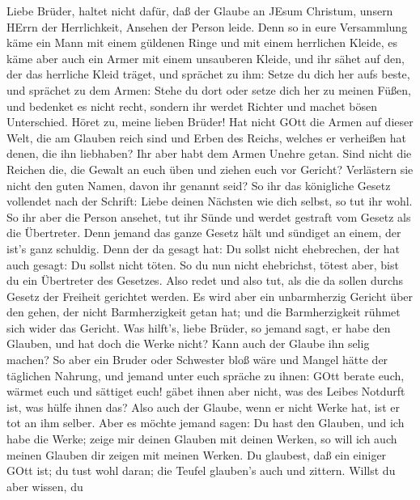  Liebe Brüder, haltet nicht dafür, daß der Glaube an JEsum
Christum, unsern HErrn der Herrlichkeit, Ansehen der Person leide.
 Denn so in eure Versammlung käme ein Mann mit einem
güldenen Ringe und mit einem herrlichen Kleide, es käme aber auch ein
Armer mit einem unsauberen Kleide,  und ihr sähet auf den,
der das herrliche Kleid träget, und sprächet zu ihm: Setze du dich her
aufs beste, und sprächet zu dem Armen: Stehe du dort oder setze dich her
zu meinen Füßen,  und bedenket es nicht recht, sondern ihr
werdet Richter und machet bösen Unterschied.  Höret zu,
meine lieben Brüder! Hat nicht GOtt die Armen auf dieser Welt, die am
Glauben reich sind und Erben des Reichs, welches er verheißen hat denen,
die ihn liebhaben?  Ihr aber habt dem Armen Unehre getan.
Sind nicht die Reichen die, die Gewalt an euch üben und ziehen euch vor
Gericht?  Verlästern sie nicht den guten Namen, davon ihr
genannt seid?  So ihr das königliche Gesetz vollendet nach
der Schrift: Liebe deinen Nächsten wie dich selbst, so tut ihr wohl.
 So ihr aber die Person ansehet, tut ihr Sünde und werdet
gestraft vom Gesetz als die Übertreter.  Denn jemand das
ganze Gesetz hält und sündiget an einem, der ist's ganz schuldig.
 Denn der da gesagt hat: Du sollst nicht ehebrechen, der
hat auch gesagt: Du sollst nicht töten. So du nun nicht ehebrichst,
tötest aber, bist du ein Übertreter des Gesetzes.  Also
redet und also tut, als die da sollen durchs Gesetz der Freiheit
gerichtet werden.  Es wird aber ein unbarmherzig Gericht
über den gehen, der nicht Barmherzigkeit getan hat; und die
Barmherzigkeit rühmet sich wider das Gericht.  Was hilft's,
liebe Brüder, so jemand sagt, er habe den Glauben, und hat doch die
Werke nicht? Kann auch der Glaube ihn selig machen?  So
aber ein Bruder oder Schwester bloß wäre und Mangel hätte der täglichen
Nahrung,  und jemand unter euch spräche zu ihnen: GOtt
berate euch, wärmet euch und sättiget euch! gäbet ihnen aber nicht, was
des Leibes Notdurft ist, was hülfe ihnen das?  Also auch
der Glaube, wenn er nicht Werke hat, ist er tot an ihm selber.
 Aber es möchte jemand sagen: Du hast den Glauben, und ich
habe die Werke; zeige mir deinen Glauben mit deinen Werken, so will ich
auch meinen Glauben dir zeigen mit meinen Werken.  Du
glaubest, daß ein einiger GOtt ist; du tust wohl daran; die Teufel
glauben's auch und zittern.  Willst du aber wissen, du
